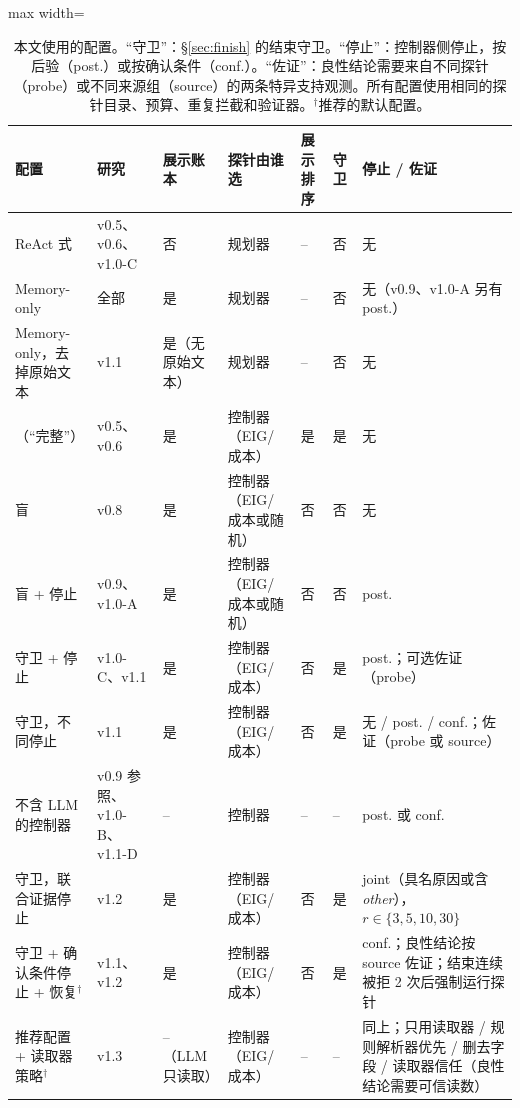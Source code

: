 \begin{table}[t]
  \caption{本文使用的配置。“守卫”：\S\ref{sec:finish} 的结束守卫。“停止”：控制器侧停止，按后验（post.）或按确认条件（conf.）。“佐证”：良性结论需要来自不同探针（probe）或不同来源组（source）的两条特异支持观测。所有配置使用相同的探针目录、预算、重复拦截和验证器。$^\dagger$推荐的默认配置。}
  \label{tab:configs}
  \centering\small
  \begin{adjustbox}{max width=\textwidth}
  \begin{tabular}{lllllll}
    \toprule
    配置 & 研究 & 展示账本 & 探针由谁选 & 展示排序 & 守卫 & 停止 / 佐证 \\
    \midrule
    ReAct 式 & v0.5、v0.6、v1.0-C & 否 & 规划器 & -- & 否 & 无 \\
    Memory-only & 全部 & 是 & 规划器 & -- & 否 & 无（v0.9、v1.0-A 另有 post.） \\
    Memory-only，去掉原始文本 & v1.1 & 是（无原始文本） & 规划器 & -- & 否 & 无 \\
    \hesp{}（“完整”） & v0.5、v0.6 & 是 & 控制器（EIG/成本） & 是 & 是 & 无 \\
    \hesp{} 盲 & v0.8 & 是 & 控制器（EIG/成本或随机） & 否 & 否 & 无 \\
    \hesp{} 盲 + 停止 & v0.9、v1.0-A & 是 & 控制器（EIG/成本或随机） & 否 & 否 & post. \\
    \hesp{} 守卫 + 停止 & v1.0-C、v1.1 & 是 & 控制器（EIG/成本） & 否 & 是 & post.；可选佐证（probe） \\
    \hesp{} 守卫，不同停止 & v1.1 & 是 & 控制器（EIG/成本） & 否 & 是 & 无 / post. / conf.；佐证（probe 或 source） \\
    不含 LLM 的控制器 & v0.9 参照、v1.0-B、v1.1-D & -- & 控制器 & -- & -- & post. 或 conf. \\
    \hesp{} 守卫，联合证据停止 & v1.2 & 是 & 控制器（EIG/成本） & 否 & 是 & joint（具名原因或含 \textit{other}），$r \in \{3,5,10,30\}$ \\
    \hesp{} 守卫 + 确认条件停止 + 恢复$^\dagger$ & v1.1、v1.2 & 是 & 控制器（EIG/成本） & 否 & 是 & conf.；良性结论按 source 佐证；结束连续被拒 2 次后强制运行探针 \\
    推荐配置 + 读取器策略$^\dagger$ & v1.3 & --（LLM 只读取） & 控制器（EIG/成本） & -- & -- & 同上；只用读取器 / 规则解析器优先 / 删去字段 / 读取器信任（良性结论需要可信读数） \\
    \bottomrule
  \end{tabular}
  \end{adjustbox}
\end{table}


